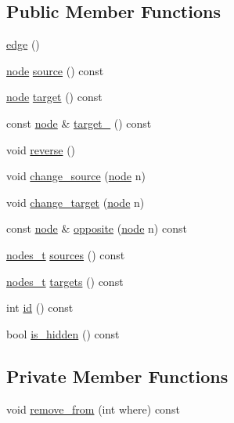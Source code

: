 \subsection*{Public Member Functions}
\begin{DoxyCompactItemize}
\item 
\mbox{\hyperlink{classedge_a746a705d37781374c8d5991abd1f7f58}{edge}} ()
\item 
\mbox{\hyperlink{classnode}{node}} \mbox{\hyperlink{classedge_ae82d5701f7e6f71edc3c8b0e34bcd2b7}{source}} () const
\item 
\mbox{\hyperlink{classnode}{node}} \mbox{\hyperlink{classedge_a97563b611261478ee19c6ce055f1a3ee}{target}} () const
\item 
const \mbox{\hyperlink{classnode}{node}} \& \mbox{\hyperlink{classedge_aa8e46723982d3e630377fb75669711de}{target\+\_\+}} () const
\item 
void \mbox{\hyperlink{classedge_ad62516eb40dbee9f57a2078cfd97b4c9}{reverse}} ()
\item 
void \mbox{\hyperlink{classedge_ad9e615b1a11bbc88aae2b166d377f354}{change\+\_\+source}} (\mbox{\hyperlink{classnode}{node}} n)
\item 
void \mbox{\hyperlink{classedge_a2f797fda0f41412265d793982f2cf953}{change\+\_\+target}} (\mbox{\hyperlink{classnode}{node}} n)
\item 
const \mbox{\hyperlink{classnode}{node}} \& \mbox{\hyperlink{classedge_ab64dc3659c9003337b0c3749a8b879cf}{opposite}} (\mbox{\hyperlink{classnode}{node}} n) const
\item 
\mbox{\hyperlink{edge_8h_a22ac17689106ba21a84e7bc54d1199d6}{nodes\+\_\+t}} \mbox{\hyperlink{classedge_a6250fa136b02ad8f20e1dbc113a020a5}{sources}} () const
\item 
\mbox{\hyperlink{edge_8h_a22ac17689106ba21a84e7bc54d1199d6}{nodes\+\_\+t}} \mbox{\hyperlink{classedge_a0bdfb4ca94e3df982b0a0dd91b9ce514}{targets}} () const
\item 
int \mbox{\hyperlink{classedge_aa7635988ab396748d6081ae5d273923b}{id}} () const
\item 
bool \mbox{\hyperlink{classedge_ab6d6192a90b1cb77ce9dee2de78d9743}{is\+\_\+hidden}} () const
\end{DoxyCompactItemize}
\subsection*{Private Member Functions}
\begin{DoxyCompactItemize}
\item 
void \mbox{\hyperlink{classedge_abcd4eeaf23327d026beac9ee1d0fa7e9}{remove\+\_\+from}} (int where) const
\end{DoxyCompactItemize}
